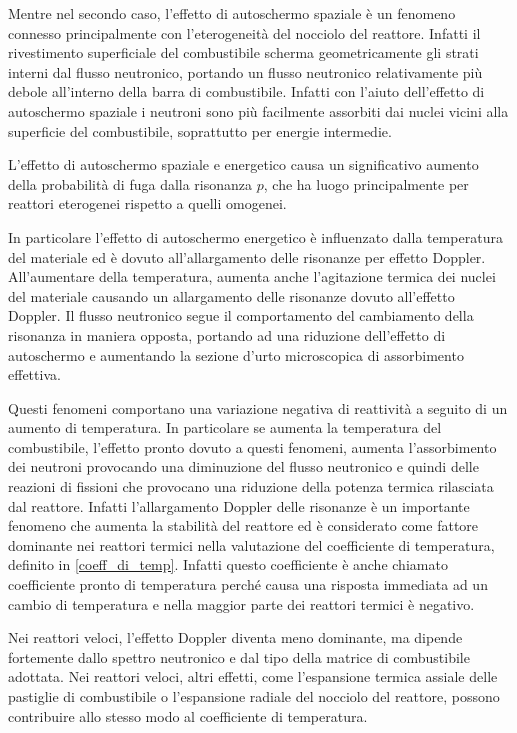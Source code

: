 Mentre nel secondo caso, l'effetto di autoschermo spaziale è un fenomeno 
connesso principalmente con l'eterogeneità del nocciolo del reattore.
Infatti il rivestimento superficiale del combustibile scherma geometricamente 
gli strati interni dal flusso neutronico, portando un flusso neutronico 
relativamente più debole all'interno della barra di combustibile.
Infatti con l'aiuto dell'effetto di autoschermo spaziale i neutroni sono più 
facilmente assorbiti dai nuclei vicini alla superficie del combustibile, soprattutto per energie intermedie.

L'effetto di autoschermo spaziale e energetico causa un significativo aumento 
della probabilità di fuga dalla risonanza $p$, che ha luogo principalmente per 
reattori eterogenei rispetto a quelli omogenei.

In particolare l'effetto di autoschermo energetico è influenzato dalla 
temperatura del materiale ed è dovuto all'allargamento delle risonanze per 
effetto Doppler.
All'aumentare della temperatura, aumenta anche l'agitazione termica dei nuclei 
del materiale causando un allargamento delle risonanze dovuto all'effetto 
Doppler. 
Il flusso neutronico segue il comportamento del cambiamento della risonanza in 
maniera opposta, portando ad una riduzione dell'effetto di autoschermo e 
aumentando la sezione d'urto microscopica di assorbimento effettiva.

Questi fenomeni comportano una variazione negativa di reattività a seguito di un 
aumento di temperatura. In particolare se aumenta la temperatura del 
combustibile, l'effetto pronto dovuto a questi fenomeni, aumenta l'assorbimento 
dei neutroni provocando una diminuzione del flusso neutronico e quindi delle 
reazioni di fissioni che provocano una riduzione della potenza termica 
rilasciata dal reattore.
Infatti l'allargamento Doppler delle risonanze è un importante fenomeno che 
aumenta la stabilità del reattore ed è considerato come fattore dominante 
nei reattori termici nella valutazione del coefficiente di temperatura, 
definito in \eqref{coeff_di_temp}.
Infatti questo coefficiente è anche chiamato coefficiente pronto di temperatura 
perché causa una risposta immediata ad un cambio di temperatura e nella maggior 
parte dei reattori termici è negativo.

Nei reattori veloci, l'effetto Doppler diventa meno dominante, ma dipende 
fortemente dallo spettro neutronico e dal tipo della matrice di combustibile 
adottata. Nei reattori veloci, altri effetti, come l'espansione termica assiale 
delle pastiglie di combustibile o l'espansione radiale del nocciolo del 
reattore, possono contribuire allo stesso modo al coefficiente di temperatura.

